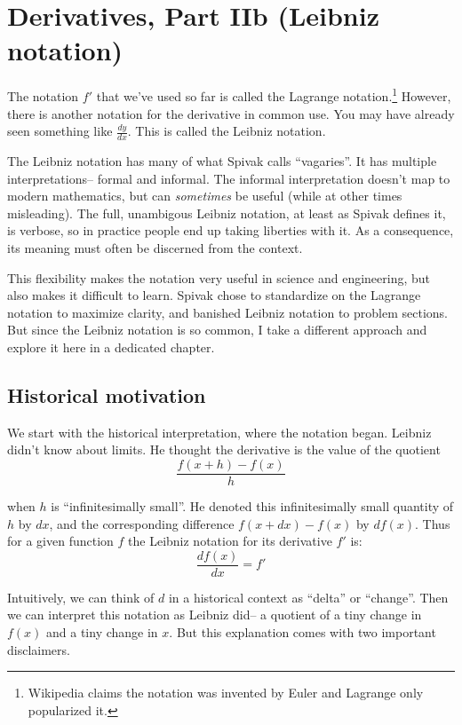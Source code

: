 
\section{Derivatives, Part IIb (Leibniz notation)}

The notation $f'$ that we've used so far is called the Lagrange
notation.\footnote{Wikipedia claims the notation was invented by Euler
  and Lagrange only popularized it.} However, there is another
notation for the derivative in common use. You may have already seen
something like $\frac{dy}{dx}$. This is called the Leibniz notation.

\vs

The Leibniz notation has many of what Spivak calls ``vagaries''. It
has multiple interpretations-- formal and informal. The informal
interpretation doesn't map to modern mathematics, but can
\textit{sometimes} be useful (while at other times misleading). The
full, unambigous Leibniz notation, at least as Spivak defines it, is
verbose, so in practice people end up taking liberties with it. As a
consequence, its meaning must often be discerned from the context.

\vs

This flexibility makes the notation very useful in science and
engineering, but also makes it difficult to learn. Spivak chose to
standardize on the Lagrange notation to maximize clarity, and banished
Leibniz notation to problem sections. But since the Leibniz notation
is so common, I take a different approach and explore it here in a
dedicated chapter.

\subsection{Historical motivation}

We start with the historical interpretation, where the notation began.
Leibniz didn't know about limits. He thought the derivative is the
value of the quotient
\[\frac{f(x+h)-f(x)}{h}\]

when $h$ is ``infinitesimally small''. He denoted this infinitesimally
small quantity of $h$ by $dx$, and the corresponding difference
$f(x+dx)-f(x)$ by $df(x)$. Thus for a given function $f$ the Leibniz
notation for its derivative $f'$ is:
\[\frac{df(x)}{dx}=f'\]

Intuitively, we can think of $d$ in a historical context as ``delta''
or ``change''. Then we can interpret this notation as Leibniz did-- a
quotient of a tiny change in $f(x)$ and a tiny change in $x$. But this
explanation comes with two important disclaimers.

